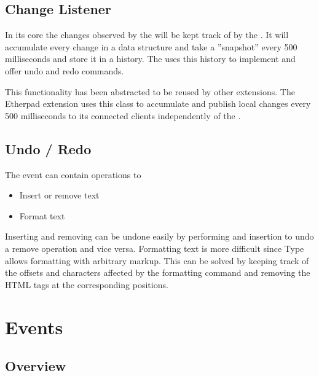 \subsection{Change Listener}

In its core the changes observed by the  will be kept track of by the . It will accumulate every change in a data structure and take a ''snapshot'' every 500 milliseconds and store it in a history. The  uses this history to implement and offer undo and redo commands.

This functionality has been abstracted to be reused by other extensions. The Etherpad extension uses this class to accumulate and publish local changes every 500 milliseconds to its connected clients independently of the .

\subsection{Undo / Redo}

The  event can contain operations to

\begin{itemize}
\item Insert or remove text
\item Format text
\end{itemize}

Inserting and removing can be undone easily by performing and insertion to undo a remove operation and vice versa. Formatting text is more difficult since Type allows formatting with arbitrary markup. This can be solved by keeping track of the offsets and characters affected by the formatting command and removing the HTML tags at the corresponding positions.






\section{Events}
\label{sec:events}
\subsection{Overview}

